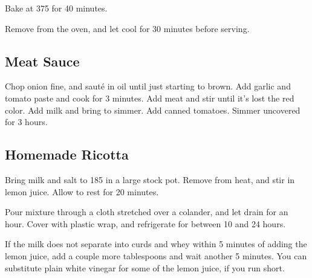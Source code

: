 \begin{recipe}
Bake at 375\degree{} for 40 minutes.

Remove from the oven, and let cool for 30 minutes before serving.

\newpage

\subsection{Meat Sauce}



Chop onion fine, and sauté in oil until just starting to brown. Add garlic and tomato paste and cook for 3 minutes.
Add meat and stir until it's lost the red color. Add milk and bring to simmer. Add canned tomatoes.
Simmer uncovered for 3 hours.

\subsection{Homemade Ricotta}


Bring milk and salt to 185\degree{} in a large stock pot. Remove from heat, and stir in lemon juice. Allow to rest for 20 minutes.

Pour mixture through a cloth stretched over a colander, and let drain for an hour. Cover with plastic wrap, and refrigerate for between 10 and 24 hours.

If the milk does not separate into curds and whey within 5 minutes of adding the lemon juice, add a couple more tablespoons and wait another 5 minutes. You can substitute plain white vinegar for some of the lemon juice, if you run short.

\end{recipe}
